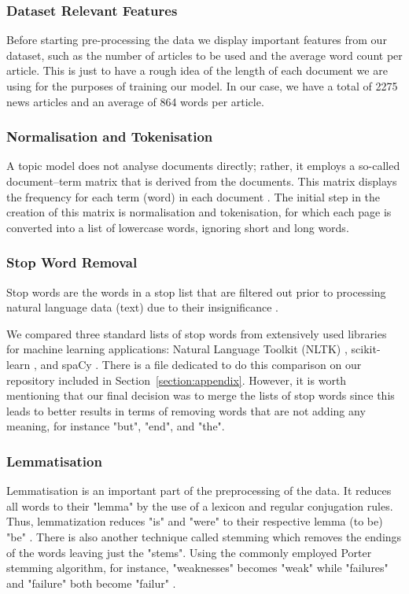 \documentclass[twoside,12pt,a4paper]{article}
\begin{document}
\subsubsection{Dataset Relevant Features}
Before starting pre-processing the data we display important features from our dataset, such as the number of articles to be used and the average word count per article. This is just to have a rough idea of the length of each document we are using for the purposes of training our model. In our case, we have a total of 2275 news articles and an average of 864 words per article.

\subsubsection{Normalisation and Tokenisation}
A topic model does not analyse documents directly; rather, it employs a so-called document–term matrix that is derived from the documents. This matrix displays the frequency for each term (word) in each document \citep{jacobi_quantitative_2016}. The initial step in the creation of this matrix is normalisation and tokenisation, for which each page is converted into a list of lowercase words, ignoring short and long words.

\subsubsection{Stop Word Removal}
Stop words are the words in a stop list that are filtered out prior to processing natural language data (text) due to their insignificance \citep{rajaraman_mining_2011}.

We compared three standard lists of stop words from extensively used libraries for machine learning applications: Natural Language Toolkit (NLTK) \citep{bird_natural_nodate}, scikit-learn \citep{pedregosa_scikit-learn_nodate}, and spaCy \citep{spacy2}. There is a file dedicated to do this comparison on our repository included in Section~\ref{section:appendix}. However, it is worth mentioning that our final decision was to merge the lists of stop words since this leads to better results in terms of removing words that are not adding any meaning, for instance "but", "end", and "the".

\subsubsection{Lemmatisation}
Lemmatisation is an important part of the preprocessing of the data. It reduces all words to their "lemma" by the use of a lexicon and regular conjugation rules. Thus, lemmatization reduces "is" and "were" to their respective lemma (to be) "be" \citep{jacobi_quantitative_2016}. There is also another technique called stemming which removes the endings of the words leaving just the "stems". Using the commonly employed Porter stemming algorithm, for instance, "weaknesses" becomes "weak" while "failures" and "failure" both become "failur" \citep{jacobi_quantitative_2016}. 
\end{document}

